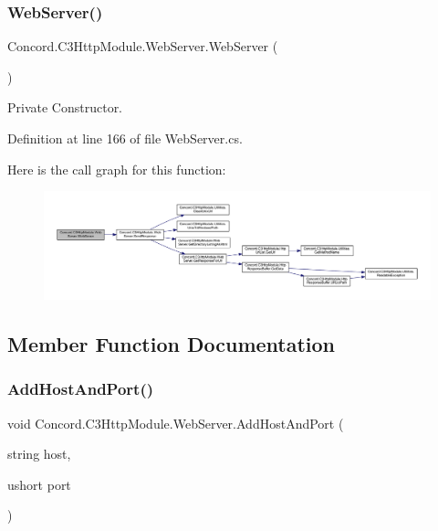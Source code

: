 \subsubsection{\texorpdfstring{WebServer()}{WebServer()}}
{\footnotesize\ttfamily Concord.\+C3\+Http\+Module.\+Web\+Server.\+Web\+Server (\begin{DoxyParamCaption}{ }\end{DoxyParamCaption})\hspace{0.3cm}{\ttfamily [inline]}}



Private Constructor. 



Definition at line 166 of file Web\+Server.\+cs.

Here is the call graph for this function\+:
\nopagebreak
\begin{figure}[H]
\begin{center}
\leavevmode
\includegraphics[width=350pt]{class_concord_1_1_c3_http_module_1_1_web_server_a1f9e775ee54aa91662039d7f1a549193_cgraph}
\end{center}
\end{figure}


\subsection{Member Function Documentation}
\mbox{\label{class_concord_1_1_c3_http_module_1_1_web_server_a3a0d02f87177a358cdf1442828829221}} 
\subsubsection{\texorpdfstring{AddHostAndPort()}{AddHostAndPort()}}
{\footnotesize\ttfamily void Concord.\+C3\+Http\+Module.\+Web\+Server.\+Add\+Host\+And\+Port (\begin{DoxyParamCaption}\item[{string}]{host,  }\item[{ushort}]{port }\end{DoxyParamCaption})\hspace{0.3cm}{\ttfamily [inline]}}




